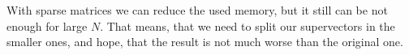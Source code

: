 With sparse matrices we can reduce the used memory, but it still can be not enough for large $N$. That means, that we need to split our supervectors in the smaller ones, and hope, that the result is not much worse than the original one. 
%
%
%
%	
%	
%	
%	
%	
%	
%
%
%
%

	
	
	